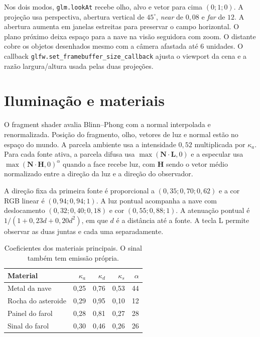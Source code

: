\documentclass[12pt,a4paper]{article}
\begin{document}
Nos dois modos, \texttt{glm.lookAt} recebe olho, alvo e vetor para cima $(0;1;0)$. A projeção usa perspectiva, abertura vertical de $45^\circ$, \emph{near} de $0{,}08$ e \emph{far} de $12$. A abertura aumenta em janelas estreitas para preservar o campo horizontal. O plano próximo deixa espaço para a nave na visão seguidora com zoom. O distante cobre os objetos desenhados mesmo com a câmera afastada até $6$ unidades. O callback \texttt{glfw.set\_framebuffer\_size\_callback} ajusta o viewport da cena e a razão largura/altura usada pelas duas projeções.

\section{Iluminação e materiais}

O fragment shader avalia Blinn--Phong com a normal interpolada e renormalizada. Posição do fragmento, olho, vetores de luz e normal estão no espaço do mundo. A parcela ambiente usa a intensidade $0{,}52$ multiplicada por $\kappa_a$. Para cada fonte ativa, a parcela difusa usa $\max(\mathbf{N}\cdot\mathbf{L},0)$ e a especular usa $\max(\mathbf{N}\cdot\mathbf{H},0)^\alpha$ quando a face recebe luz, com $\mathbf{H}$ sendo o vetor médio normalizado entre a direção da luz e a direção do observador.

A direção fixa da primeira fonte é proporcional a $(0{,}35;0{,}70;0{,}62)$ e a cor RGB linear é $(0{,}94;0{,}94;1)$. A luz pontual acompanha a nave com deslocamento $(0{,}32;0{,}40;0{,}18)$ e cor $(0{,}55;0{,}88;1)$. A atenuação pontual é $1/(1+0{,}23d+0{,}20d^2)$, em que $d$ é a distância até a fonte. A tecla L permite observar as duas juntas e cada uma separadamente.

\begin{table}[H]
\centering\small
\begin{tabular}{lrrrr}
\toprule
Material & $\kappa_a$ & $\kappa_d$ & $\kappa_s$ & $\alpha$ \\
\midrule
Metal da nave & 0,25 & 0,76 & 0,53 & 44 \\
Rocha do asteroide & 0,29 & 0,95 & 0,10 & 12 \\
Painel do farol & 0,28 & 0,81 & 0,27 & 28 \\
Sinal do farol & 0,30 & 0,46 & 0,26 & 26 \\
\bottomrule
\end{tabular}
\caption{Coeficientes dos materiais principais. O sinal também tem emissão própria.}
\end{table}
\end{document}
